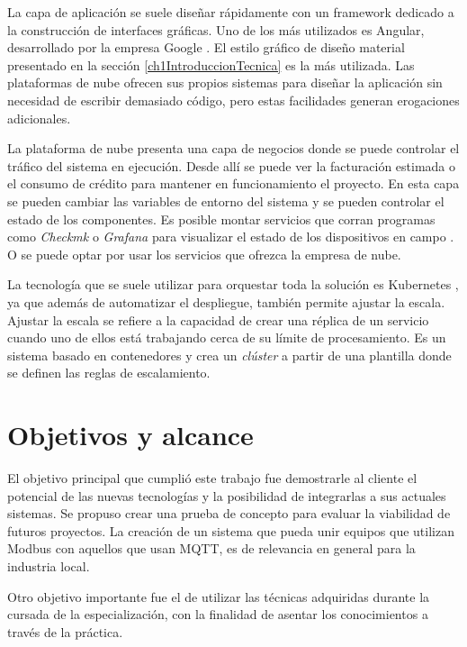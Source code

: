 La capa de aplicación se suele diseñar rápidamente con un framework dedicado a la construcción de interfaces gráficas.
Uno de los más utilizados es Angular, desarrollado por la empresa Google \citep{WEBSITE:Angulario}.
El estilo gráfico de diseño material presentado en la sección \ref{ch1IntroduccionTecnica} es la más utilizada.
Las plataformas de nube ofrecen sus propios sistemas para diseñar la aplicación sin necesidad de escribir demasiado código, pero estas facilidades generan erogaciones adicionales.

La plataforma de nube presenta una capa de negocios donde se puede controlar el tráfico del sistema en ejecución.
Desde allí se puede ver la facturación estimada o el consumo de crédito para mantener en funcionamiento el proyecto.
En esta capa se pueden cambiar las variables de entorno del sistema y se pueden controlar el estado de los componentes.
Es posible montar servicios que corran programas como \emph{Checkmk} o \emph{Grafana} para visualizar el estado de los dispositivos en campo \citep{betke2017real}. O se puede optar por usar los servicios que ofrezca la empresa de nube.

La tecnología que se suele utilizar para orquestar toda la solución es Kubernetes \citep{burns2018kubernetes}, ya que además de automatizar el despliegue, también permite ajustar la escala.
Ajustar la escala se refiere a la capacidad de crear una réplica de un servicio cuando uno de ellos está trabajando cerca de su límite de procesamiento.
Es un sistema basado en contenedores y crea un \emph{clúster} a partir de una plantilla donde se definen las reglas de escalamiento.

\section{Objetivos y alcance}
\label{objetivos}

El objetivo principal que cumplió este trabajo fue demostrarle al cliente el potencial de las nuevas tecnologías y la posibilidad de integrarlas a sus actuales sistemas.
Se propuso crear una prueba de concepto para evaluar la viabilidad de futuros proyectos.
La creación de un sistema que pueda unir equipos que utilizan Modbus con aquellos que usan MQTT, es de relevancia en general para la industria local.

Otro objetivo importante fue el de utilizar las técnicas adquiridas durante la cursada de la especialización, con la finalidad de asentar los conocimientos a través de la práctica.

